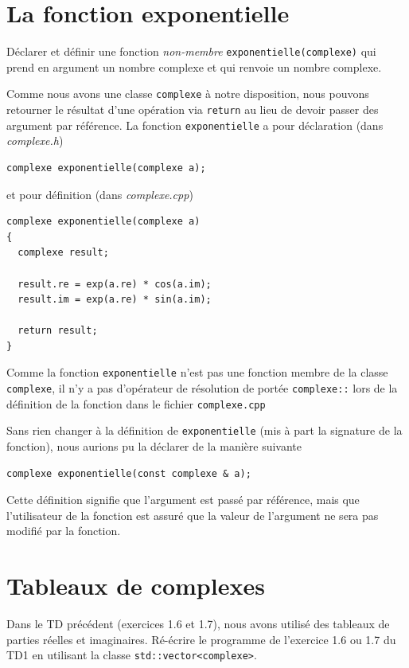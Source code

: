 \documentclass{book}
\newcommand{\inline}[1]{\texttt{#1}}
\def\filename{\emph}
\begin{document}
\section{La fonction exponentielle}
Déclarer et définir une fonction \emph{non-membre} \inline{exponentielle(complexe)} qui prend en argument un nombre complexe et qui renvoie un nombre complexe.

\begin{correction}
Comme nous avons une classe \inline{complexe} à notre disposition, nous pouvons retourner le résultat d'une opération via \inline{return} au lieu de devoir passer des argument par référence. La fonction \inline{exponentielle} a pour déclaration (dans \filename{complexe.h})
\begin{verbatim}
complexe exponentielle(complexe a);
\end{verbatim}
et pour définition (dans \filename{complexe.cpp})
\begin{verbatim}
complexe exponentielle(complexe a)
{
  complexe result;

  result.re = exp(a.re) * cos(a.im);
  result.im = exp(a.re) * sin(a.im);

  return result;
}
\end{verbatim}
Comme la fonction \inline{exponentielle} n'est pas une fonction membre de la classe \inline{complexe}, il n'y a pas d'opérateur de résolution de portée \inline{complexe::} lors de la définition de la fonction dans le fichier \inline{complexe.cpp}

Sans rien changer à la définition de \inline{exponentielle} (mis à part la signature de la fonction), nous aurions pu la déclarer de la manière suivante
\begin{verbatim}
complexe exponentielle(const complexe & a);
\end{verbatim}
Cette définition signifie que l'argument est passé par référence, mais que l'utilisateur de la fonction est assuré que la valeur de l'argument ne sera pas modifié par la fonction.\\

\end{correction}

\section{Tableaux de complexes}

Dans le TD précédent (exercices 1.6 et 1.7), nous avons utilisé des tableaux de parties réelles et imaginaires. Ré-écrire le programme de l'exercice 1.6 ou 1.7 du TD1 en utilisant la classe \inline{std::vector<complexe>}.\\
\end{document}
